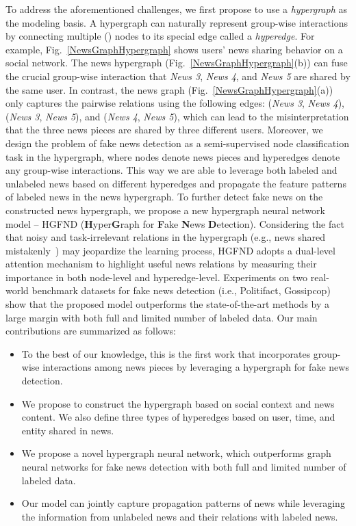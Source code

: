 \documentclass[conference]{IEEEtran}
\begin{document}
To address the aforementioned challenges, we first propose to use a \textit{hypergraph} as the modeling basis. A hypergraph can naturally represent group-wise interactions by connecting multiple () nodes to its special edge called a \textit{hyperedge}. For example, Fig.~\ref{NewsGraphHypergraph} shows users' news sharing behavior on a social network. The news hypergraph (Fig.~\ref{NewsGraphHypergraph}(b)) can fuse the crucial group-wise interaction that \textit{News 3}, \textit{News 4}, and \textit{News 5} are shared by the same user. In contrast, the news graph (Fig.~\ref{NewsGraphHypergraph}(a)) only captures the pairwise relations using the following edges: (\textit{News 3}, \textit{News 4}), (\textit{News 3}, \textit{News 5}), and (\textit{News 4}, \textit{News 5}), which can lead to the misinterpretation that the three news pieces are shared by three different users. Moreover, we design the problem of fake news detection as a semi-supervised node classification task in the hypergraph, where nodes denote news pieces and hyperedges denote any group-wise interactions. This way we are able to leverage both labeled and unlabeled news based on different hyperedges and propagate the feature patterns of labeled news in the news hypergraph. To further detect fake news on the constructed news hypergraph, we propose a new hypergraph neural network model -- HGFND (\textbf{H}yper\textbf{G}raph for \textbf{F}ake \textbf{N}ews \textbf{D}etection). Considering the fact that noisy and task-irrelevant relations in the hypergraph (e.g., news shared mistakenly~\cite{zhou2022fake}) may jeopardize the learning process, HGFND adopts a dual-level attention mechanism to highlight useful news relations by measuring their importance in both node-level and hyperedge-level. Experiments on two real-world benchmark datasets for fake news detection (i.e., Politifact, Gossipcop) show that the proposed model outperforms the state-of-the-art methods by a large margin with both full and limited number of labeled data. Our main contributions are summarized as follows:


\begin{itemize}
     \item To the best of our knowledge, this is the first work that incorporates group-wise interactions among news pieces by leveraging a hypergraph for fake news detection. 
	\item We propose to construct the hypergraph based on social context and news content. We also define three types of hyperedges based on user, time, and entity shared in news.
	\item We propose a novel hypergraph neural network, which outperforms graph neural networks for fake news detection with both full and limited number of labeled data.
    \item Our model can jointly capture propagation patterns of news while leveraging the  information from unlabeled news and their relations with labeled news.

\end{itemize}
\end{document}
